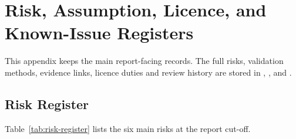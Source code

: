 
\chapter{Risk, Assumption, Licence, and Known-Issue Registers}
\label{app:risks}

This appendix keeps the main report-facing records. The full risks, validation
methods, evidence links, licence duties and review history are stored in
,
,
 and
.

\section{Risk Register}

Table~\ref{tab:risk-register} lists the six main risks at the report cut-off.

